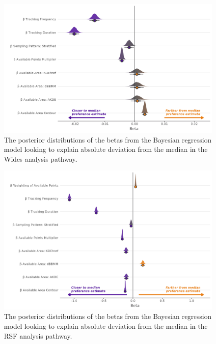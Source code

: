 \documentclass[10pt,a4paper]{article}
\begin{document}
\begin{figure}
\includegraphics[width=1\linewidth]{../figures/wides_dEstWides_effectsPlot} \caption{The posterior distributions of the betas from the Bayesian regression model looking to explain absolute deviation from the median in the Wides analysis pathway.}\label{fig:dEstBetasWides}
\end{figure}

\begin{figure}
\includegraphics[width=1\linewidth]{../figures/rsf_dEstRSF_effectsPlot} \caption{The posterior distributions of the betas from the Bayesian regression model looking to explain absolute deviation from the median in the RSF analysis pathway.}\label{fig:dEstBetasRSF}
\end{figure}
\end{document}
